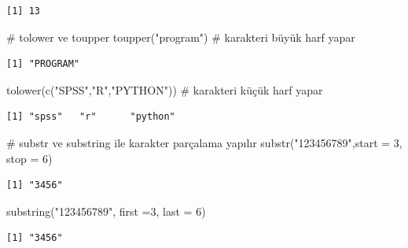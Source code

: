 \documentclass[
  letterpaper,
  DIV=11,
  numbers=noendperiod]{scrreprt}
\newenvironment{Shaded}{\begin{snugshade}}{\end{snugshade}}
\newcommand{\AttributeTok}[1]{\textcolor[rgb]{0.40,0.45,0.13}{#1}}
\newcommand{\CommentTok}[1]{\textcolor[rgb]{0.37,0.37,0.37}{#1}}
\newcommand{\DecValTok}[1]{\textcolor[rgb]{0.68,0.00,0.00}{#1}}
\newcommand{\FunctionTok}[1]{\textcolor[rgb]{0.28,0.35,0.67}{#1}}
\newcommand{\NormalTok}[1]{\textcolor[rgb]{0.00,0.23,0.31}{#1}}
\newcommand{\StringTok}[1]{\textcolor[rgb]{0.13,0.47,0.30}{#1}}
\begin{document}
\begin{verbatim}
[1] 13
\end{verbatim}

\begin{Shaded}
\begin{Highlighting}[]
\CommentTok{\# tolower ve toupper }
\FunctionTok{toupper}\NormalTok{(}\StringTok{"program"}\NormalTok{) }\CommentTok{\# karakteri büyük harf yapar}
\end{Highlighting}
\end{Shaded}

\begin{verbatim}
[1] "PROGRAM"
\end{verbatim}

\begin{Shaded}
\begin{Highlighting}[]
\FunctionTok{tolower}\NormalTok{(}\FunctionTok{c}\NormalTok{(}\StringTok{"SPSS"}\NormalTok{,}\StringTok{"R"}\NormalTok{,}\StringTok{"PYTHON"}\NormalTok{)) }\CommentTok{\# karakteri küçük harf yapar}
\end{Highlighting}
\end{Shaded}

\begin{verbatim}
[1] "spss"   "r"      "python"
\end{verbatim}

\begin{Shaded}
\begin{Highlighting}[]
\CommentTok{\# substr ve substring ile karakter parçalama yapılır}
\FunctionTok{substr}\NormalTok{(}\StringTok{"123456789"}\NormalTok{,}\AttributeTok{start =} \DecValTok{3}\NormalTok{, }\AttributeTok{stop =} \DecValTok{6}\NormalTok{)}
\end{Highlighting}
\end{Shaded}

\begin{verbatim}
[1] "3456"
\end{verbatim}

\begin{Shaded}
\begin{Highlighting}[]
\FunctionTok{substring}\NormalTok{(}\StringTok{"123456789"}\NormalTok{, }\AttributeTok{first =}\DecValTok{3}\NormalTok{, }\AttributeTok{last =} \DecValTok{6}\NormalTok{)}
\end{Highlighting}
\end{Shaded}

\begin{verbatim}
[1] "3456"
\end{verbatim}
\end{document}
